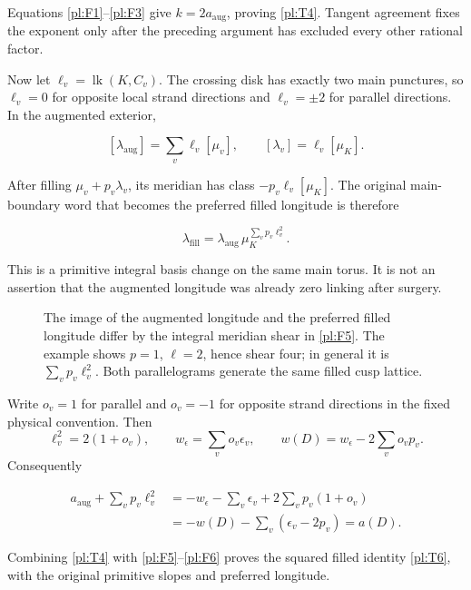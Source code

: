 Equations \eqref{pl:F1}--\eqref{pl:F3} give \(k=2a_{\mathrm{aug}}\), proving
\eqref{pl:T4}. Tangent agreement fixes the exponent only after the
preceding argument has excluded every other rational factor.

Now let \(\ell_v=\operatorname{lk}(K,C_v)\).
The crossing disk has exactly two main punctures, so
\(\ell_v=0\) for opposite local strand directions and
\(\ell_v=\pm2\) for parallel directions. In the augmented
exterior,

\begin{equation}\label{pl:F4}
[\lambda_{\mathrm{aug}}]=\sum_v\ell_v[\mu_v],
             \qquad [\lambda_v]=\ell_v[\mu_K].
\end{equation}

After filling \(\mu_v+p_v\lambda_v\), its meridian has
class \(-p_v\ell_v[\mu_K]\). The original main-boundary
word that becomes the preferred filled longitude is therefore

\begin{equation}\label{pl:F5}
\lambda_{\mathrm{fill}}
       =\lambda_{\mathrm{aug}}\,
                       \mu_K^{\sum_vp_v\ell_v^2}.
\end{equation}

This is a primitive integral basis change on the same main
torus. It is not an assertion that the augmented longitude
was already zero linking after surgery.



\begin{figure}[tb]
\centering
\caption{The image of the augmented longitude and the preferred filled longitude differ by the integral meridian shear in \eqref{pl:F5}. The example shows $p=1$, $\ell=2$, hence shear four; in general it is $\sum_vp_v\ell_v^2$. Both parallelograms generate the same filled cusp lattice.}
\end{figure}

Write \(o_v=1\) for parallel and \(o_v=-1\) for
opposite strand directions in the fixed physical convention.
Then
\[
 \ell_v^2=2(1+o_v),\qquad
 w_\epsilon=\sum_vo_v\epsilon_v,\qquad
 w(D)=w_\epsilon-2\sum_vo_vp_v.
\]
Consequently

\begin{equation}\label{pl:F6}
\begin{aligned}
 a_{\mathrm{aug}}+\sum_vp_v\ell_v^2
  &=-w_\epsilon-\sum_v\epsilon_v+2\sum_vp_v(1+o_v)\\
  &=-w(D)-\sum_v(\epsilon_v-2p_v)=a(D).
\end{aligned}
\end{equation}

Combining \eqref{pl:T4} with \eqref{pl:F5}--\eqref{pl:F6} proves the squared filled
identity \eqref{pl:T6}, with the original primitive slopes and
preferred longitude.
